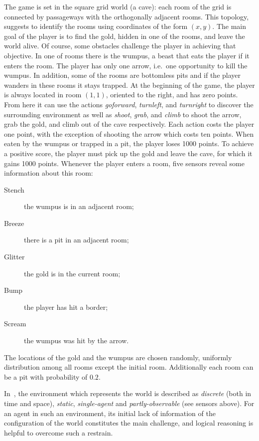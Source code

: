 \documentclass{llncs}
\begin{document}
The game is set in the square grid world (a cave): each room of the grid is connected by passageways with the orthogonally adjacent rooms. This topology, suggests to identify the rooms using coordinates of the form $(x, y)$.
The main goal of the player is to find the gold, hidden in one of the rooms, and leave the world alive.
Of course, some obstacles challenge the player in achieving that objective.
In one of rooms there is the wumpus, a beast that eats the player if it enters the room. The player has only one arrow, i.e.\ one opportunity to kill the wumpus.
In addition, some of the rooms are bottomless pits and if the player wanders in these rooms it stays trapped.
At the beginning of the game, the player is always located in room $(1,1)$, oriented to the right, and has zero points. From here it can use the actions \emph{goforward}, \emph{turnleft}, and \emph{turnright} to discover the surrounding environment as well as \emph{shoot}, \emph{grab}, and \emph{climb} to shoot the arrow, grab the gold, and climb out of the cave respectively.
Each action costs the player one point, with the exception of shooting the arrow which costs ten points. When eaten by the wumpus or trapped in a pit, the player loses 1000 points. To achieve a positive score, the player must pick up the gold and leave the cave, for which it gains 1000 points.
Whenever the player enters a room, five sensors reveal some information about this room:
\begin{description}
	\item[Stench]{the wumpus is in an adjacent room;}
	\item[Breeze]{there is a pit in an adjacent room;}
	\item[Glitter]{the gold is in the current room;}
	\item[Bump]{the player has hit a border;}
	\item[Scream]{the wumpus was hit by the arrow.}
\end{description}
The locations of the gold and the wumpus are chosen randomly, uniformly distribution among all rooms except the initial room. Additionally each room can be a pit with probability of $0.2$.

In~\cite{book:aima}, the environment which represents the world is described as \emph{discrete} (both in time and space), \emph{static}, \emph{single-agent} and \emph{partly-observable} (see sensors above). For an agent in such an environment, its initial lack of information of the configuration of the world constitutes the main challenge, and logical reasoning is helpful to overcome such a restrain.
\end{document}
